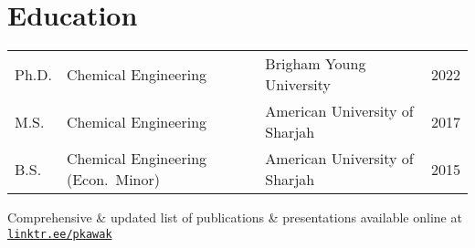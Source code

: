 \documentclass[letterpaper,12pt]{article}
\begin{document}
\section*{Education}%
\begin{tabular}{@{}p{} p{} p{} r@{}}
  Ph.D.   & Chemical Engineering        & Brigham Young University       & 2022 \\ %
  M.S.    &  Chemical Engineering       & American University of Sharjah & 2017 \\ %
  B.S.    & Chemical Engineering (Econ.~Minor) & American University of Sharjah & 2015 \\ %
\end{tabular}

\vspace{1.0\baselineskip}
\begin{center}
  \begin{footnotesize}
    Comprehensive \& updated list of publications \& presentations available online at \href{https://linktr.ee/pkawak}{\tt linktr.ee/pkawak}\\
  \end{footnotesize}
\end{center}
\end{document}
